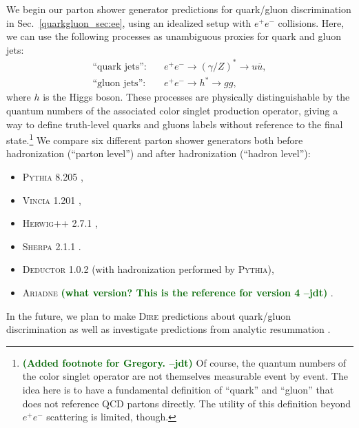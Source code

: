 \documentclass[11pt]{cernrep}
\newcommand{\jdt}[1]{\textbf{\textcolor{darkgreen}{(#1 --jdt)}}}
\begin{document}
We begin our parton shower generator predictions for quark/gluon discrimination in Sec.~\ref{quarkgluon_sec:ee}, using an idealized setup with $e^+e^-$ collisions.  Here, we can use the following processes as unambiguous proxies for quark and gluon jets:
\begin{align}
\text{``quark jets''}: \quad & e^+e^- \to (\gamma/Z)^* \to u \overline{u}, \\
\text{``gluon jets''}: \quad & e^+e^- \to h^* \to g g,
\end{align}
where $h$ is the Higgs boson.  These processes are physically
distinguishable by the quantum numbers of the associated color singlet
production operator, giving a way to define truth-level quarks and
gluons labels without reference to the final state.\footnote{\jdt{Added footnote for Gregory.}  Of course, the quantum numbers of the color singlet operator are not themselves measurable event by event.  The idea here is to have a fundamental definition of ``quark'' and ``gluon'' that does not reference QCD partons directly.  The utility of this definition beyond $e^+e^-$ scattering is limited, though.}  We
compare six different parton shower generators both before
hadronization (``parton level'') and after hadronization (``hadron
level''):
\begin{itemize}
\item \textsc{Pythia 8.205} \cite{Sjostrand:2014zea},
\item \textsc{Vincia 1.201} \cite{Giele:2013ema},
\item \textsc{Herwig++ 2.7.1} \cite{Bellm:2013hwb},
\item \textsc{Sherpa 2.1.1} \cite{Gleisberg:2008ta}.
\item \textsc{Deductor 1.0.2} \cite{Nagy:2014mqa} (with hadronization performed by \textsc{Pythia}),
\item \textsc{Ariadne} \jdt{what version?  This is the reference for version 4} \cite{Lonnblad:1992tz}.
\end{itemize}
In the future, we plan to make \textsc{Dire} \cite{Hoche:2015sya} predictions about quark/gluon discrimination as well as investigate predictions from analytic resummation \cite{Larkoski:2013eya,Larkoski:2014pca}.
\end{document}
